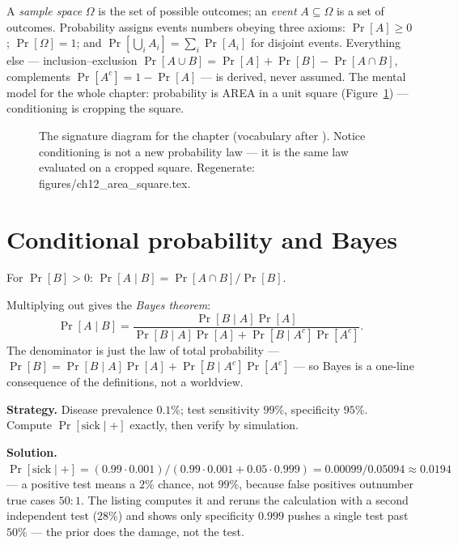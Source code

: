 A \emph{sample space} $\Omega$ is the set of possible
outcomes; an \emph{event} $A\subseteq\Omega$ is a set of outcomes.
Probability assigns events numbers obeying three axioms: $\Pr[A]\ge0$; $\Pr[\Omega]=1$; and
$\Pr[\bigcup_i A_i]=\sum_i\Pr[A_i]$ for disjoint events. Everything else
--- inclusion--exclusion
$\Pr[A\cup B]=\Pr[A]+\Pr[B]-\Pr[A\cap B]$, complements
$\Pr[A^{c}]=1-\Pr[A]$ --- is derived, never assumed. The mental model for
the whole chapter: probability is AREA in a unit square
(Figure~\ref{fig:areasq}) --- conditioning is cropping the square.

\begin{figure}[htbp]
\centering

\caption{The signature diagram for the chapter (vocabulary after
\cite{colah}). Notice conditioning is not a new probability law --- it
is the same law evaluated on a cropped square.
Regenerate: \ttfamily figures/ch12\_area\_square.tex.}
\label{fig:areasq}
\end{figure}

\section{Conditional probability and Bayes}\label{sec:prob-bayes}

\begin{definition}
For $\Pr[B]>0$: $\Pr[A\mid B]=\Pr[A\cap B]/\Pr[B]$.
\end{definition}

Multiplying out gives the \emph{Bayes theorem}:
\[
\Pr[A\mid B]=\frac{\Pr[B\mid A]\Pr[A]}{\Pr[B\mid A]\Pr[A]+
\Pr[B\mid A^{c}]\Pr[A^{c}]}.
\]
The denominator is just the law of total probability ---
$\Pr[B]=\Pr[B\mid A]\Pr[A]+\Pr[B\mid A^{c}]\Pr[A^{c}]$ --- so Bayes is a
one-line consequence of the definitions, not a worldview.

\begin{example}\label{ex:bayes}
\textbf{Strategy.} Disease prevalence $0.1\%$; test sensitivity $99\%$,
specificity $95\%$. Compute $\Pr[\text{sick}\mid+]$ exactly, then verify
by simulation.

\textbf{Solution.}
$\Pr[\text{sick}\mid+]=(0.99\cdot0.001)/(0.99\cdot0.001+0.05\cdot0.999)
=0.00099/0.05094\approx0.0194$ --- a positive test means a $2\%$ chance,
not $99\%$, because false positives outnumber true cases $50{:}1$. The
listing computes it and reruns the calculation with a second independent
test ($28\%$) and shows only specificity $0.999$ pushes a single test past
$50\%$ --- the prior does the damage, not the test.
\end{example}

